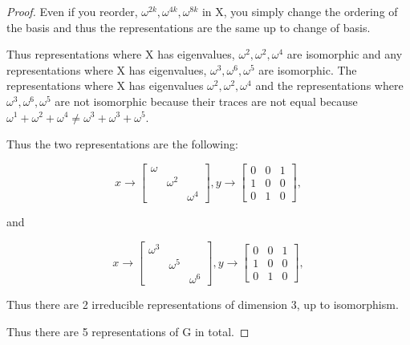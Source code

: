 \documentclass{article}
\begin{document}
\begin{proof}
    Even if you reorder, $\omega^{2k}, \omega^{4k}, \omega^{8k}$ in X, you simply change the ordering of the basis and thus the representations are the same up to change of basis. 
    
    Thus representations where X has eigenvalues, $\omega^{2}, \omega^{2}, \omega^{4}$ are isomorphic and any representations where X has eigenvalues, $\omega^{3}, \omega^{6}, \omega^{5}$ are isomorphic. The representations where X has eigenvalues $\omega^{2}, \omega^{2}, \omega^{4}$ and the representations where $\omega^{3}, \omega^{6}, \omega^{5}$ are not isomorphic because their traces are not equal because $\omega^1 + \omega^2 + \omega^4 \neq \omega^3 + \omega^3 + \omega^5$.


    Thus the two representations are the following:

    \[
        x \to \begin{bmatrix}
            \omega \\  & \omega^{2} \\  & & \omega^{4}
        \end{bmatrix}, y \to \begin{bmatrix}
            0 & 0 & 1 \\ 1 & 0 & 0 \\  0 & 1 & 0
        \end{bmatrix},
    \]

    and

    \[
        x \to \begin{bmatrix}
            \omega^3 \\  & \omega^{5} \\  & & \omega^{6}
        \end{bmatrix}, y \to \begin{bmatrix}
            0 & 0 & 1 \\ 1 & 0 & 0 \\  0 & 1 & 0
        \end{bmatrix},
    \]

    Thus there are 2 irreducible representations of dimension 3, up to isomorphism. 

    Thus there are 5 representations of G in total. 

    
\end{proof}
\end{document}

